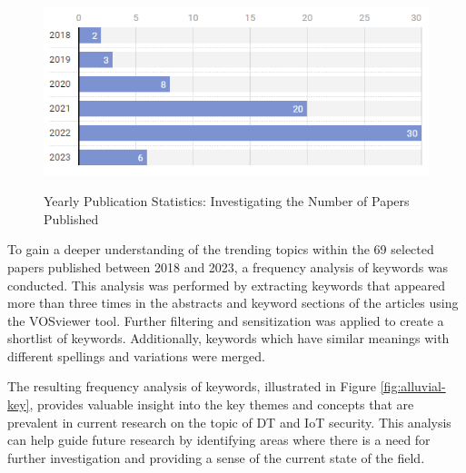 \begin{figure}[H]    
    \caption{Yearly Publication Statistics: Investigating the Number of Papers Published}
    \includegraphics[width=\textwidth]{images/newimages/paper-per-yerapublished-v2.png}
    \label{fig:bar-chart-yaer}
\end{figure}

To gain a deeper understanding of the trending topics within the 69 selected papers published between 2018 and 2023, a frequency analysis of keywords was conducted. This analysis was performed by extracting keywords that appeared more than three times in the abstracts and keyword sections of the articles using the VOSviewer tool. Further filtering and sensitization was applied to create a shortlist of keywords. Additionally, keywords which have similar meanings with different spellings and variations were merged. 

The resulting frequency analysis of keywords, illustrated in Figure \ref{fig:alluvial-key}, provides valuable insight into the key themes and concepts that are prevalent in current research on the topic of DT and IoT security. This analysis can help guide future research by identifying areas where there is a need for further investigation and providing a sense of the current state of the field.


